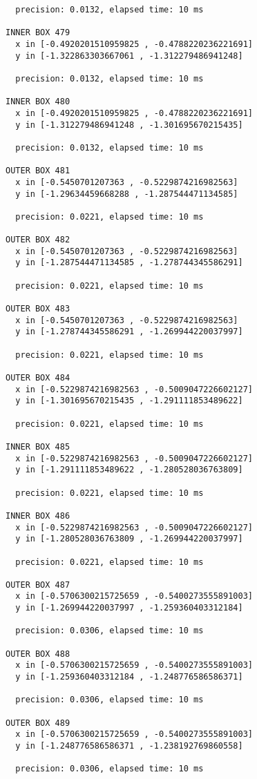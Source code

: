 \begin{verbatim}
  precision: 0.0132, elapsed time: 10 ms

INNER BOX 479
  x in [-0.4920201510959825 , -0.4788220236221691]
  y in [-1.322863303667061 , -1.312279486941248]

  precision: 0.0132, elapsed time: 10 ms

INNER BOX 480
  x in [-0.4920201510959825 , -0.4788220236221691]
  y in [-1.312279486941248 , -1.301695670215435]

  precision: 0.0132, elapsed time: 10 ms

OUTER BOX 481
  x in [-0.5450701207363 , -0.5229874216982563]
  y in [-1.29634459668288 , -1.287544471134585]

  precision: 0.0221, elapsed time: 10 ms

OUTER BOX 482
  x in [-0.5450701207363 , -0.5229874216982563]
  y in [-1.287544471134585 , -1.278744345586291]

  precision: 0.0221, elapsed time: 10 ms

OUTER BOX 483
  x in [-0.5450701207363 , -0.5229874216982563]
  y in [-1.278744345586291 , -1.269944220037997]

  precision: 0.0221, elapsed time: 10 ms

OUTER BOX 484
  x in [-0.5229874216982563 , -0.5009047226602127]
  y in [-1.301695670215435 , -1.291111853489622]

  precision: 0.0221, elapsed time: 10 ms

INNER BOX 485
  x in [-0.5229874216982563 , -0.5009047226602127]
  y in [-1.291111853489622 , -1.280528036763809]

  precision: 0.0221, elapsed time: 10 ms

INNER BOX 486
  x in [-0.5229874216982563 , -0.5009047226602127]
  y in [-1.280528036763809 , -1.269944220037997]

  precision: 0.0221, elapsed time: 10 ms

OUTER BOX 487
  x in [-0.5706300215725659 , -0.5400273555891003]
  y in [-1.269944220037997 , -1.259360403312184]

  precision: 0.0306, elapsed time: 10 ms

OUTER BOX 488
  x in [-0.5706300215725659 , -0.5400273555891003]
  y in [-1.259360403312184 , -1.248776586586371]

  precision: 0.0306, elapsed time: 10 ms

OUTER BOX 489
  x in [-0.5706300215725659 , -0.5400273555891003]
  y in [-1.248776586586371 , -1.238192769860558]

  precision: 0.0306, elapsed time: 10 ms


\end{verbatim}
